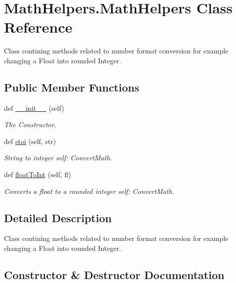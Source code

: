 \hypertarget{classMathHelpers_1_1MathHelpers}{}\section{Math\+Helpers.\+Math\+Helpers Class Reference}
\label{classMathHelpers_1_1MathHelpers}


Class contining methods related to number format conversion for example changing a Float into rounded Integer.  


\subsection*{Public Member Functions}
\begin{DoxyCompactItemize}
\item 
def \hyperlink{classMathHelpers_1_1MathHelpers_a1bedaecd2857df22a70cc1218f582f7e}{\+\_\+\+\_\+init\+\_\+\+\_\+} (self)
\begin{DoxyCompactList}\small\item\em The Constructor. \end{DoxyCompactList}\item 
def \hyperlink{classMathHelpers_1_1MathHelpers_af5f757396b1002192b5808f56a00d473}{stoi} (self, str)
\begin{DoxyCompactList}\small\item\em String to integer  self\+: Convert\+Math. \end{DoxyCompactList}\item 
def \hyperlink{classMathHelpers_1_1MathHelpers_aaa4d8aa93fcaac303e9dbf5c1fcf48ff}{float\+To\+Int} (self, fl)
\begin{DoxyCompactList}\small\item\em Converts a float to a rounded integer  self\+: Convert\+Math. \end{DoxyCompactList}\end{DoxyCompactItemize}


\subsection{Detailed Description}
Class contining methods related to number format conversion for example changing a Float into rounded Integer. 



\subsection{Constructor \& Destructor Documentation}
\mbox{\label{classMathHelpers_1_1MathHelpers_a1bedaecd2857df22a70cc1218f582f7e}} 
